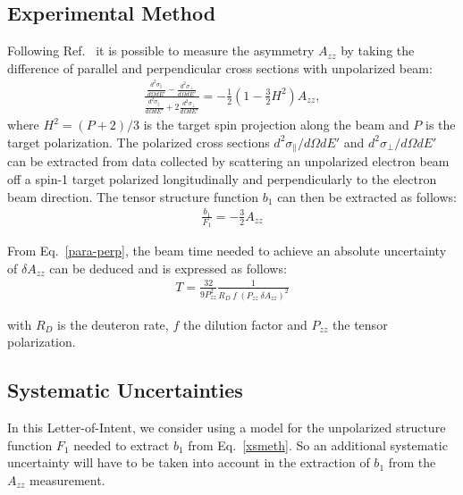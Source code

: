\subsection{Experimental Method}
Following Ref.~\cite{Hoodbhoy:1988am} it is possible to measure the asymmetry $A_{zz}$ by 
taking the difference of parallel and perpendicular cross sections with unpolarized beam:
\begin{eqnarray}
\frac{\frac{d^2\sigma_{\parallel}}{d\Omega dE'} - \frac{d^2\sigma_{\perp}}{d\Omega dE'}}
{\frac{d^2\sigma_{\parallel}}{d\Omega dE'} + 2 \frac{d^2\sigma_{\perp}}{d\Omega dE'}} = 
- \frac{1}{2} (1 - \frac{3}{2} H^2) A_{zz},
\label{para-perp}
\end{eqnarray}
%
where $H^2=(P+2)/3$ is the target spin projection along the beam and $P$ is the target polarization.
The polarized cross sections $d^2\sigma_{\parallel}/d\Omega dE'$ and $d^2\sigma_{\perp}/d\Omega dE'$ 
can be extracted from data collected by scattering an unpolarized electron beam off a spin-1 target 
polarized longitudinally and perpendicularly to the electron beam direction. 
The tensor structure function $b_1$ can then be extracted as follows:
\begin{eqnarray}
\frac{b_1}{F_1} = - \frac{3}{2} A_{zz}
\label{Azz}
\end{eqnarray}

From Eq.~\ref{para-perp}, the beam time needed to achieve an absolute uncertainty 
of $\delta A_{zz}$ can be deduced and is expressed as follows:
\begin{eqnarray}
T = \frac{32}{9 P_{zz}^2} \frac{1}{R_D~f~(P_{zz}~\delta A_{zz})^2}
\label{time-eq2}
\end{eqnarray}

with $R_D$ is the deuteron rate, $f$ the dilution factor and $P_{zz}$ the tensor polarization.

\subsection{Systematic Uncertainties}

In this Letter-of-Intent, we consider using a model for the unpolarized structure function
$F_1$ needed to extract $b_1$ from Eq.~\ref{xsmeth}. So an additional systematic uncertainty 
will have to be taken into account in the extraction of $b_1$ from the $A_{zz}$ measurement.


